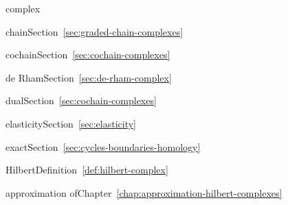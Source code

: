 \par\noindent\hspace*{0em}\label{index:complex}{complex}

\par\noindent\hspace*{1em}\label{index:complex-chain}{chain}\quad Section~\ref{sec:graded-chain-complexes}

\par\noindent\hspace*{1em}\label{index:complex-cochain}{cochain}\quad Section~\ref{sec:cochain-complexes}

\par\noindent\hspace*{1em}\label{index:complex-de-rham}{de Rham}\quad Section~\ref{sec:de-rham-complex}

\par\noindent\hspace*{1em}\label{index:complex-dual}{dual}\quad Section~\ref{sec:cochain-complexes}

\par\noindent\hspace*{1em}\label{index:complex-elasticity}{elasticity}\quad Section~\ref{sec:elasticity}

\par\noindent\hspace*{1em}\label{index:complex-exact}{exact}\quad Section~\ref{sec:cycles-boundaries-homology}

\par\noindent\hspace*{1em}\label{index:complex-hilbert}{Hilbert}\quad Definition~\ref{def:hilbert-complex}

\par\noindent\hspace*{2em}\label{index:complex-hilbert-approximation-of}{approximation of}\quad Chapter~\ref{chap:approximation-hilbert-complexes}

